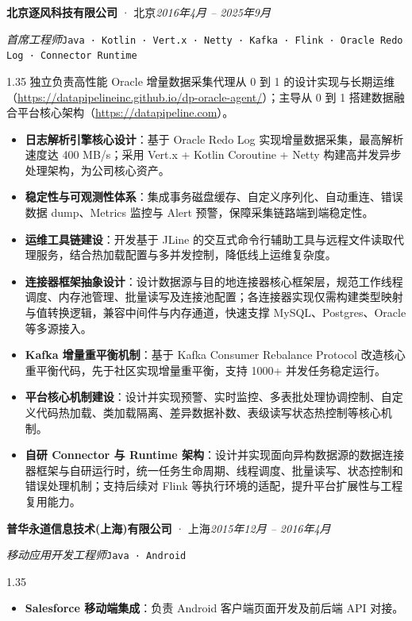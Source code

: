 \documentclass[a4paper, 11pt]{article}
\newcommand{\datedsubsection}[2]{%
  \vspace{4pt}\noindent #1\hfill\textit{#2}\par\vspace{1pt}%
}
\newcommand{\role}[2]{%
  \noindent\textit{#1}\enspace\texttt{#2}\par%
}
\newenvironment{onehalfzspacing}{\begin{spacing}{1.35}}{\end{spacing}}
\begin{document}
\datedsubsection{\textbf{北京逐风科技有限公司} · 北京}{2016年4月 -- 2025年9月}
\role{首席工程师}{Java · Kotlin · Vert.x · Netty · Kafka · Flink · Oracle Redo Log · Connector Runtime}
\begin{onehalfzspacing}
独立负责高性能 Oracle 增量数据采集代理从 0 到 1 的设计实现与长期运维（\url{https://datapipelineinc.github.io/dp-oracle-agent/}）；主导从 0 到 1 搭建数据融合平台核心架构（\url{https://datapipeline.com}）。
\begin{itemize}
  \item \textbf{日志解析引擎核心设计}：基于 Oracle Redo Log 实现增量数据采集，最高解析速度达 400 MB/s；采用 Vert.x + Kotlin Coroutine + Netty 构建高并发异步处理架构，为公司核心资产。
  \item \textbf{稳定性与可观测性体系}：集成事务磁盘缓存、自定义序列化、自动重连、错误数据 dump、Metrics 监控与 Alert 预警，保障采集链路端到端稳定性。
  \item \textbf{运维工具链建设}：开发基于 JLine 的交互式命令行辅助工具与远程文件读取代理服务，结合热加载配置与多并发控制，降低线上运维复杂度。
  \item \textbf{连接器框架抽象设计}：设计数据源与目的地连接器核心框架层，规范工作线程调度、内存池管理、批量读写及连接池配置；各连接器实现仅需构建类型映射与值转换逻辑，兼容中间件与内存通道，快速支撑 MySQL、Postgres、Oracle 等多源接入。
  \item \textbf{Kafka 增量重平衡机制}：基于 Kafka Consumer Rebalance Protocol 改造核心重平衡代码，先于社区实现增量重平衡，支持 1000+ 并发任务稳定运行。
  \item \textbf{平台核心机制建设}：设计并实现预警、实时监控、多表批处理协调控制、自定义代码热加载、类加载隔离、差异数据补数、表级读写状态热控制等核心机制。
  \item \textbf{自研 Connector 与 Runtime 架构}：设计并实现面向异构数据源的数据连接器框架与自研运行时，统一任务生命周期、线程调度、批量读写、状态控制和错误处理机制；支持后续对 Flink 等执行环境的适配，提升平台扩展性与工程复用能力。
\end{itemize}
\end{onehalfzspacing}

\datedsubsection{\textbf{普华永道信息技术(上海)有限公司} · 上海}{2015年12月 -- 2016年4月}
\role{移动应用开发工程师}{Java · Android}
\begin{onehalfzspacing}
\begin{itemize}
  \item \textbf{Salesforce 移动端集成}：负责 Android 客户端页面开发及前后端 API 对接。
\end{itemize}
\end{onehalfzspacing}
\end{document}
